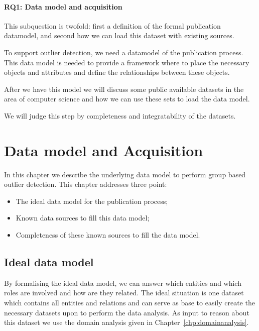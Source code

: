 \documentclass{ou-report}
\begin{document}
\subsubsection*{RQ1: Data model and acquisition}
This subquestion is twofold: first a definition of the formal publication datamodel, 
and second how we can load this dataset with existing sources.

To support outlier detection, we need a datamodel of the publication process. This 
data model is needed to provide a framework where to place the necessary objects and 
attributes and define the relationships between these objects.

After we have this model we will discuss some public available datasets in the area 
of computer science and how we can use these sets to load the data model. 

We will judge this step by completeness and integratability of the datasets.





\chapter{Data model and Acquisition}
\label{chp:data}
In this chapter we describe the underlying data model to perform group based 
outlier detection. This chapter addresses three point:
\begin{itemize}
    \item The ideal data model for the publication process;
    \item Known data sources to fill this data model;
    \item Completeness of these known sources to fill the data model.
\end{itemize}


\section{Ideal data model}
By formalising the ideal data model, we can answer which entities and which 
roles are involved and how are they related.
The ideal situation is one dataset which contains all entities and relations 
and can serve as base to easily create the necessary datasets upon to perform 
the data analysis. As 
input to reason about this dataset we use the domain analysis given in 
Chapter~\ref{chp:domainanalysis}.
\end{document}

